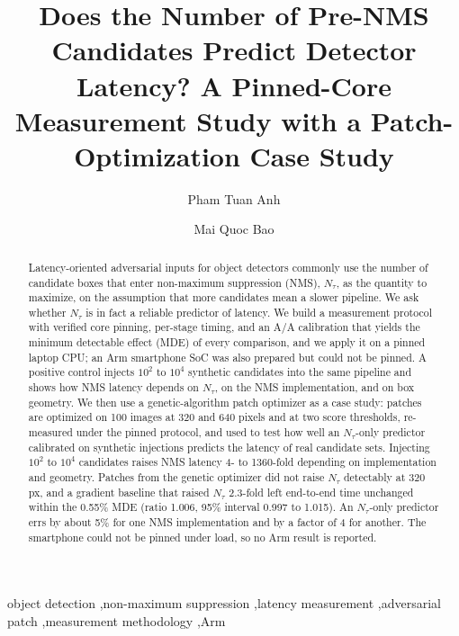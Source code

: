 \documentclass[a4paper,fleqn]{cas-dc}
\newcommand{\Ntau}{N_{\tau}}
\begin{document}
\let\WriteBookmarks\relax
\def\floatpagepagefraction{1}
\def\textpagefraction{.001}
\title[mode=title]{Does the Number of Pre-NMS Candidates Predict Detector Latency? A Pinned-Core Measurement Study with a Patch-Optimization Case Study}
\author[1]{Pham Tuan Anh}
\author[1]{Mai Quoc Bao}

\begin{abstract}
Latency-oriented adversarial inputs for object detectors commonly use the number of candidate boxes that enter non-maximum suppression (NMS), $\Ntau$, as the quantity to maximize, on the assumption that more candidates mean a slower pipeline. We ask whether $\Ntau$ is in fact a reliable predictor of latency. We build a measurement protocol with verified core pinning, per-stage timing, and an A/A calibration that yields the minimum detectable effect (MDE) of every comparison, and we apply it on a pinned laptop CPU; an Arm smartphone SoC was also prepared but could not be pinned. A positive control injects $10^2$ to $10^4$ synthetic candidates into the same pipeline and shows how NMS latency depends on $\Ntau$, on the NMS implementation, and on box geometry. We then use a genetic-algorithm patch optimizer as a case study: patches are optimized on 100 images at 320 and 640 pixels and at two score thresholds, re-measured under the pinned protocol, and used to test how well an $\Ntau$-only predictor calibrated on synthetic injections predicts the latency of real candidate sets. Injecting $10^2$ to $10^4$ candidates raises NMS latency 4- to 1360-fold depending on implementation and geometry. Patches from the genetic optimizer did not raise $\Ntau$ detectably at 320 px, and a gradient baseline that raised $\Ntau$ 2.3-fold left end-to-end time unchanged within the 0.55\% MDE (ratio 1.006, 95\% interval 0.997 to 1.015). An $\Ntau$-only predictor errs by about 5\% for one NMS implementation and by a factor of 4 for another. The smartphone could not be pinned under load, so no Arm result is reported.
\end{abstract}

\begin{keywords}
object detection \sep non-maximum suppression \sep latency measurement \sep adversarial patch \sep measurement methodology \sep Arm
\end{keywords}
\maketitle
\end{document}

